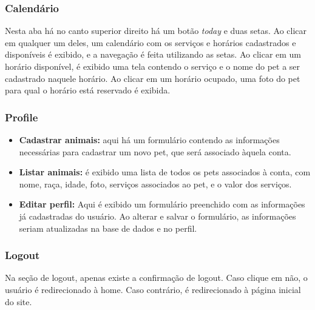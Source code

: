 \documentclass[10pt,a4paper]{article}
\begin{document}
\subsubsection{Calendário}
Nesta aba há no canto superior direito há um botão \textit{today} e duas setas. Ao clicar em qualquer um deles, um calendário com os serviços e horários cadastrados e disponíveis é exibido, e a navegação é feita utilizando as setas. Ao clicar em um horário disponível, é exibido uma tela contendo o serviço e o nome do pet a ser cadastrado naquele horário. Ao clicar em um horário ocupado, uma foto do pet para qual o horário está reservado é exibida.
\subsubsection{Profile}
\begin{itemize}
\item \textbf{Cadastrar animais:} aqui há um formulário contendo as informações necessárias para cadastrar um novo pet, que será associado àquela conta.
\item \textbf{Listar animais:} é exibido uma lista de todos os pets associados à conta, com nome, raça, idade, foto, serviços associados ao pet, e o valor dos serviços.
\item \textbf{Editar perfil:} Aqui é exibido um formulário preenchido com as informações já cadastradas do usuário. Ao alterar e salvar o formulário, as informações seriam atualizadas na base de dados e no perfil.
\end{itemize}
\subsubsection{Logout}
Na seção de logout, apenas existe a confirmação de logout. Caso clique em não, o usuário é redirecionado à home. Caso contrário, é redirecionado à página inicial do site.
\end{document}
